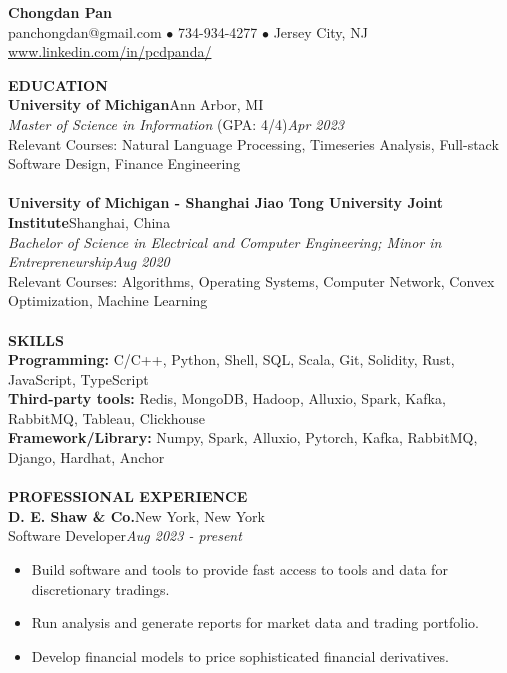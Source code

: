 \documentclass[10pt,a4paper]{article}
\begin{document}
\begin{center}
    \Large{\textbf{Chongdan Pan}}\\
    \normalsize{panchongdan@gmail.com $\bullet$ 734-934-4277 $\bullet$ Jersey City, NJ}\\
    \normalsize{\href{https://www.linkedin.com/in/pandapcd/}{www.linkedin.com/in/pcdpanda/}}
\end{center}
\noindent
\rlap{\rule[-1mm]{\linewidth}{.5mm}}\textbf{\large{EDUCATION}}\\
\noindent\textbf{University of Michigan}\hfill Ann Arbor, MI\\
\emph{Master of Science in Information} (GPA: 4/4)\hfill\emph{Apr 2023}\\
Relevant Courses: Natural Language Processing, Timeseries Analysis, Full-stack Software Design, Finance Engineering \\\\
\textbf{University of Michigan - Shanghai Jiao Tong University Joint Institute}\hfill Shanghai, China\\
\emph{Bachelor of Science in Electrical and Computer Engineering; Minor in Entrepreneurship}\hfill\emph{Aug 2020}\\
Relevant Courses: Algorithms, Operating Systems, Computer Network, Convex Optimization, Machine Learning\\\\
\noindent
\rlap{\rule[-1mm]{\linewidth}{.5mm}}\textbf{\large{SKILLS}}\\
\textbf{Programming: }C/C++, Python, Shell, SQL, Scala, Git, Solidity, Rust, JavaScript, TypeScript\\
\textbf{Third-party tools: }Redis, MongoDB, Hadoop, Alluxio, Spark, Kafka, RabbitMQ, Tableau, Clickhouse\\
\textbf{Framework/Library: }Numpy, Spark, Alluxio, Pytorch, Kafka, RabbitMQ, Django, Hardhat, Anchor\\\\
\noindent
\rlap{\rule[-1mm]{\linewidth}{.5mm}}\textbf{\large{PROFESSIONAL EXPERIENCE}}\\
\textbf{D. E. Shaw \& Co.}\hfill New York, New York\\
Software Developer\hfill\emph{Aug 2023 - present}
\begin{itemize}[noitemsep,topsep=0pt]
    \item Build software and tools to provide fast access to tools and data for discretionary tradings.
    \item Run analysis and generate reports for market data and trading portfolio.  
    \item Develop financial models to price sophisticated financial derivatives.
\end{itemize}
\end{document}
